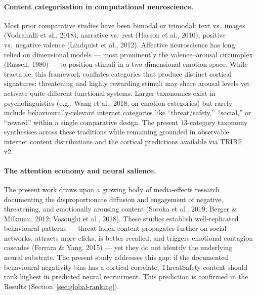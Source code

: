 \documentclass[11pt,letterpaper]{article}
\numberwithin{equation}{section}
\begin{document}
\paragraph{Content categorisation in computational neuroscience.} Most prior comparative studies have been bimodal or trimodal: text vs.\ images (Vodrahalli et al., 2018), narrative vs.\ rest (Hasson et al., 2010), positive vs.\ negative valence (Lindquist et al., 2012). Affective neuroscience has long relied on dimensional models --- most prominently the valence--arousal circumplex (Russell, 1980) --- to position stimuli in a two-dimensional emotion space. While tractable, this framework conflates categories that produce distinct cortical signatures: threatening and highly rewarding stimuli may share arousal levels yet activate quite different functional systems. Larger taxonomies exist in psycholinguistics (e.g., Wang et al., 2018, on emotion categories) but rarely include behaviourally-relevant internet categories like ``threat/safety,'' ``social,'' or ``reward'' within a single comparative design. The present 13-category taxonomy synthesises across these traditions while remaining grounded in observable internet content distributions and the cortical predictions available via TRIBE v2.

\paragraph{The attention economy and neural salience.} The present work draws upon a growing body of media-effects research documenting the disproportionate diffusion and engagement of negative, threatening, and emotionally arousing content (Soroka et al., 2019; Berger \& Milkman, 2012; Vosoughi et al., 2018). These studies establish well-replicated behavioural patterns --- threat-laden content propagates further on social networks, attracts more clicks, is better recalled, and triggers emotional contagion cascades (Ferrara \& Yang, 2015) --- yet they do not identify the underlying neural substrate. The present study addresses this gap: if the documented behavioural negativity bias has a cortical correlate, ThreatSafety content should rank highest in predicted neural recruitment. This prediction is confirmed in the Results (Section~\ref{sec:global-ranking}).
\end{document}
